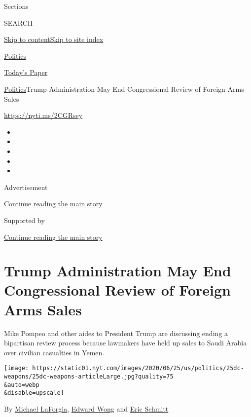 Sections

SEARCH

\protect\hyperlink{site-content}{Skip to
content}\protect\hyperlink{site-index}{Skip to site index}

\href{https://www.nytimes.com/section/politics}{Politics}

\href{https://myaccount.nytimes.com/auth/login?response_type=cookie\&client_id=vi}{}

\href{https://www.nytimes.com/section/todayspaper}{Today's Paper}

\href{/section/politics}{Politics}\textbar{}Trump Administration May End
Congressional Review of Foreign Arms Sales

\url{https://nyti.ms/2CGRsey}

\begin{itemize}
\item
\item
\item
\item
\item
\end{itemize}

Advertisement

\protect\hyperlink{after-top}{Continue reading the main story}

Supported by

\protect\hyperlink{after-sponsor}{Continue reading the main story}

\hypertarget{trump-administration-may-end-congressional-review-of-foreign-arms-sales}{%
\section{Trump Administration May End Congressional Review of Foreign
Arms
Sales}\label{trump-administration-may-end-congressional-review-of-foreign-arms-sales}}

Mike Pompeo and other aides to President Trump are discussing ending a
bipartisan review process because lawmakers have held up sales to Saudi
Arabia over civilian casualties in Yemen.

\texttt{[image: https://static01.nyt.com/images/2020/06/25/us/politics/25dc-weapons/25dc-weapons-articleLarge.jpg?quality=75\\\&auto=webp\\\&disable=upscale]}

By \href{https://www.nytimes.com/by/michael-laforgia}{Michael LaForgia},
\href{https://www.nytimes.com/by/edward-wong}{Edward Wong} and
\href{https://www.nytimes.com/by/eric-schmitt}{Eric Schmitt}


